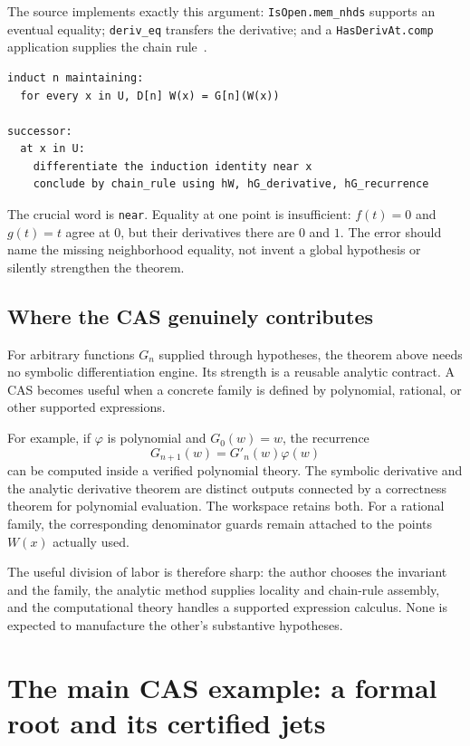 \documentclass[11pt,letterpaper]{article}
\newcommand{\code}[1]{\nolinkurl{#1}}
\theoremstyle{definition}
\theoremstyle{remark}
\begin{document}
The source implements exactly this argument: \code{IsOpen.mem_nhds} supports an
eventual equality; \code{deriv_eq} transfers the derivative; and a
\code{HasDerivAt.comp} application supplies the chain rule~\cite{p-ode}.

\begin{lstlisting}
induct n maintaining:
  for every x in U, D[n] W(x) = G[n](W(x))

successor:
  at x in U:
    differentiate the induction identity near x
    conclude by chain_rule using hW, hG_derivative, hG_recurrence
\end{lstlisting}
The crucial word is \code{near}. Equality at one point is insufficient:
$f(t)=0$ and $g(t)=t$ agree at $0$, but their derivatives there are $0$ and $1$.
The error should name the missing neighborhood equality, not invent a global
hypothesis or silently strengthen the theorem.

\subsection{Where the CAS genuinely contributes}
For arbitrary functions $G_n$ supplied through hypotheses, the theorem above
needs no symbolic differentiation engine. Its strength is a reusable analytic
contract. A CAS becomes useful when a concrete family is defined by polynomial,
rational, or other supported expressions.

For example, if $\varphi$ is polynomial and $G_0(w)=w$, the recurrence
\[
 G_{n+1}(w)=G'_n(w)\varphi(w)
\]
can be computed inside a verified polynomial theory. The symbolic derivative
and the analytic derivative theorem are distinct outputs connected by a
correctness theorem for polynomial evaluation. The workspace retains both.
For a rational family, the corresponding denominator guards remain attached
to the points $W(x)$ actually used.

The useful division of labor is therefore sharp: the author chooses the
invariant and the family, the analytic method supplies locality and chain-rule
assembly, and the computational theory handles a supported expression calculus.
None is expected to manufacture the other's substantive hypotheses.

\section{The main CAS example: a formal root and its certified jets}
\label{sec:jets}
\end{document}
